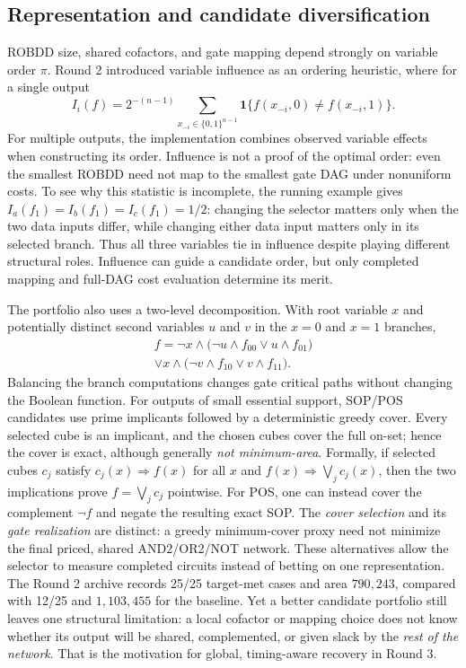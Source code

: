 \documentclass[journal,10pt]{IEEEtran}
\begin{document}
\subsection{Representation and candidate diversification}
ROBDD size, shared cofactors, and gate mapping depend strongly on variable order $\pi$. Round 2 introduced variable influence as an ordering heuristic, where for a single output
\begin{equation}
 I_i(f)=2^{-(n-1)}\sum_{x_{-i}\in\{0,1\}^{n-1}}
 \mathbf1\{f(x_{-i},0)\ne f(x_{-i},1)\}.
\end{equation}
For multiple outputs, the implementation combines observed variable effects when constructing its order. Influence is not a proof of the optimal order: even the smallest ROBDD need not map to the smallest gate DAG under nonuniform costs. To see why this statistic is incomplete, the running example gives $I_a(f_1)=I_b(f_1)=I_c(f_1)=1/2$: changing the selector matters only when the two data inputs differ, while changing either data input matters only in its selected branch. Thus all three variables tie in influence despite playing different structural roles. Influence can guide a candidate order, but only completed mapping and full-DAG cost evaluation determine its merit.

The portfolio also uses a two-level decomposition. With root variable $x$ and potentially distinct second variables $u$ and $v$ in the $x=0$ and $x=1$ branches,
\begin{multline}\label{eq:twolevel}
 f=\neg x\land\big(\neg u\land f_{00}\lor u\land f_{01}\big)\\
 \lor x\land\big(\neg v\land f_{10}\lor v\land f_{11}\big).
\end{multline}
Balancing the branch computations changes gate critical paths without changing the Boolean function. For outputs of small essential support, SOP/POS candidates use prime implicants followed by a deterministic greedy cover. Every selected cube is an implicant, and the chosen cubes cover the full on-set; hence the cover is exact, although generally \emph{not minimum-area}. Formally, if selected cubes $c_j$ satisfy $c_j(x)\Rightarrow f(x)$ for all $x$ and $f(x)\Rightarrow\bigvee_j c_j(x)$, then the two implications prove $f=\bigvee_jc_j$ pointwise. For POS, one can instead cover the complement $\neg f$ and negate the resulting exact SOP. The \emph{cover selection} and its \emph{gate realization} are distinct: a greedy minimum-cover proxy need not minimize the final priced, shared AND2/OR2/NOT network. These alternatives allow the selector to measure completed circuits instead of betting on one representation. The Round 2 archive records 25/25 target-met cases and area $790{,}243$, compared with 12/25 and $1{,}103{,}455$ for the baseline. Yet a better candidate portfolio still leaves one structural limitation: a local cofactor or mapping choice does not know whether its output will be shared, complemented, or given slack by the \emph{rest of the network}. That is the motivation for global, timing-aware recovery in Round 3.
\end{document}
